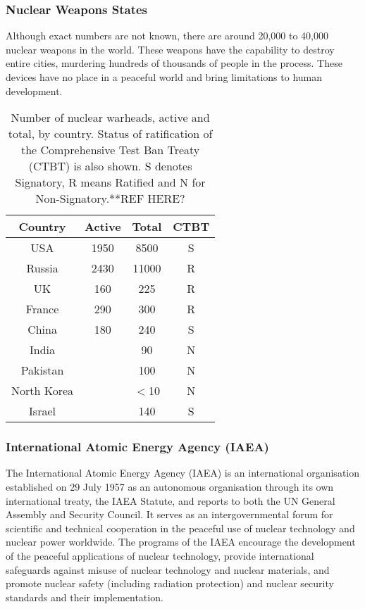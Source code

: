 \documentclass[twoside,titlepage,11pt,twocolumn,a4paper]{article}
\begin{document}
\subsubsection{Nuclear Weapons States}
Although exact numbers are not known, there are around 20,000 to
40,000 nuclear weapons in the world. \citep{worldNuclearForces2011,
  norris2010} These weapons have the capability to destroy entire
cities, murdering hundreds of thousands of people in the
process. These devices have no place in a peaceful world and bring
limitations to human development.

\begin{table}
  \begin{tabular}{|c|c|c|c|}
    \hline
    Country	& Active& Total		& CTBT	\\
    \hline
    USA		& 1950 	& 8500		& S	\\
    Russia	& 2430 	& 11000		& R	\\
    UK		& 160 	& 225		& R	\\
    France	& 290	& 300		& R	\\
    China	& 180	& 240		& S	\\
    India	&	& 90		& N	\\
    Pakistan	&	& 100		& N	\\
    North Korea	&	& \(<\)10	& N	\\
    Israel	&	& 140		& S	\\
    \hline
  \end{tabular}
  \caption{Number of nuclear warheads, active and total, by
    country. Status of ratification of the Comprehensive Test Ban
    Treaty (CTBT) is also shown. S denotes Signatory, R means Ratified
    and N for Non-Signatory.**REF HERE?}
  \label{tab:NWSwarheadsCTBT}
\end{table}

\subsubsection{International Atomic Energy Agency (IAEA)}
The International Atomic Energy Agency (IAEA) is an international
organisation established on 29 July 1957 as an autonomous organisation
through its own international treaty, the IAEA Statute, and reports to
both the UN General Assembly and Security Council. It serves as an
intergovernmental forum for scientific and technical cooperation in
the peaceful use of nuclear technology and nuclear power
worldwide. The programs of the IAEA encourage the development of the
peaceful applications of nuclear technology, provide international
safeguards against misuse of nuclear technology and nuclear materials,
and promote nuclear safety (including radiation protection) and
nuclear security standards and their implementation.
\end{document}
